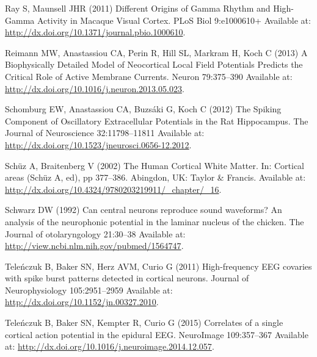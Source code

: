 \documentclass[]{article}
\begin{document}
Ray S, Maunsell JHR (2011) Different Origins of Gamma Rhythm and
High-Gamma Activity in Macaque Visual Cortex. PLoS Biol 9:e1000610+
Available at: \url{http://dx.doi.org/10.1371/journal.pbio.1000610}.

Reimann MW, Anastassiou CA, Perin R, Hill SL, Markram H, Koch C (2013) A
Biophysically Detailed Model of Neocortical Local Field Potentials
Predicts the Critical Role of Active Membrane Currents. Neuron
79:375--390 Available at:
\url{http://dx.doi.org/10.1016/j.neuron.2013.05.023}.

Schomburg EW, Anastassiou CA, Buzsáki G, Koch C (2012) The Spiking
Component of Oscillatory Extracellular Potentials in the Rat
Hippocampus. The Journal of Neuroscience 32:11798--11811 Available at:
\url{http://dx.doi.org/10.1523/jneurosci.0656-12.2012}.

Schüz A, Braitenberg V (2002) The Human Cortical White Matter. In:
Cortical areas (Schüz A, ed), pp 377--386. Abingdon, UK: Taylor \&
Francis. Available at:
\url{http://dx.doi.org/10.4324/9780203219911/_chapter/_16}.

Schwarz DW (1992) Can central neurons reproduce sound waveforms? An
analysis of the neurophonic potential in the laminar nucleus of the
chicken. The Journal of otolaryngology 21:30--38 Available at:
\url{http://view.ncbi.nlm.nih.gov/pubmed/1564747}.

Teleńczuk B, Baker SN, Herz AVM, Curio G (2011) High-frequency EEG
covaries with spike burst patterns detected in cortical neurons. Journal
of Neurophysiology 105:2951--2959 Available at:
\url{http://dx.doi.org/10.1152/jn.00327.2010}.

Teleńczuk B, Baker SN, Kempter R, Curio G (2015) Correlates of a single
cortical action potential in the epidural EEG. NeuroImage 109:357--367
Available at: \url{http://dx.doi.org/10.1016/j.neuroimage.2014.12.057}.
\end{document}
